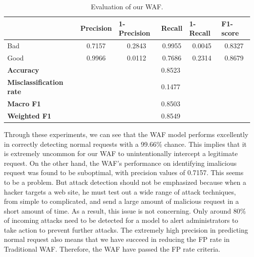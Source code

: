 \begin{table}[ht]
	\begin{tabular}{llllll}
	\hline
	\textbf{}                       & \textbf{Precision}         & \textbf{1-Precision}       & \textbf{Recall}            & \textbf{1-Recall}          & \textbf{F1-score}          \\ \hline
	Bad                             & \multicolumn{1}{c}{0.7157} & \multicolumn{1}{c}{0.2843} & \multicolumn{1}{c}{0.9955} & \multicolumn{1}{c}{0.0045} & \multicolumn{1}{c}{0.8327} \\
	Good                            & \multicolumn{1}{c}{0.9966} & \multicolumn{1}{c}{0.0112} & \multicolumn{1}{c}{0.7686} & \multicolumn{1}{c}{0.2314} & \multicolumn{1}{c}{0.8679} \\ \hline
	\textbf{Accuracy}               &                            &                            & 0.8523                     &                            &                            \\
	\textbf{Misclassification rate} &                            &                            & 0.1477                     &                            &                            \\
	\textbf{Macro F1}               &                            &                            & 0.8503                     &                            &                            \\
	\textbf{Weighted F1}            &                            &                            & 0.8549                     &                            &                            \\ \hline
	\end{tabular}
	\caption{\label{demo-table-7} Evaluation of our WAF.}
	\end{table}
	\newpage
	Through these experiments, we can see that the WAF model performs excellently in correctly detecting normal requests with a 99.66\% chance. This implies that it is extremely uncommon for our WAF to unintentionally intercept a legitimate request. On the other hand, the WAF's performance on identifying imalicious request was found to be suboptimal, with precision values of 0.7157. This seems to be a problem. But attack detection should not be emphasized because when a hacker targets a web site, he must test out a wide range of attack techniques, from simple to complicated, and send a large amount of malicious request in a short amount of time. As a result, this issue is not concerning. Only around 80\% of incoming attacks need to be detected for a model to alert administrators to take action to prevent further attacks. The extremely high precision in predicting normal request also means that we have succeed in reducing the FP rate in Traditional WAF. Therefore, the WAF have passed the FP rate criteria. 
